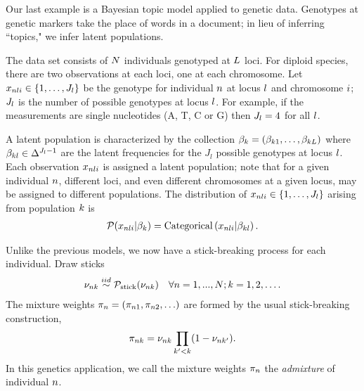 
Our last example is a Bayesian topic model applied to genetic data.
Genotypes at genetic markers take the place of
words in a document; in lieu of inferring ``topics," we infer latent populations.

\begin{ex}

The data set consists of $N$ individuals genotyped at $L$ loci.
For diploid species, there are two observations at each loci, one at each chromosome.
Let $x_{nli}\in\{1, \ldots, J_l\}$ be the genotype for individual $n$ at locus $l$ and chromosome $i$;
$J_l$ is the number of possible genotypes at locus $l$.
For example, if the measurements are single nucleotides (A, T, C or G)
then $J_l = 4$ for all $l$.

A latent population is characterized by the collection
$\beta_k = (\beta_{k1}, \ldots, \beta_{kL})$ where
$\beta_{kl}\in\Delta^{J_l - 1}$ are the latent frequencies for the $J_l$
possible genotypes at locus $l$.
Each observation $x_{nli}$ is assigned a latent population;
note that for a given individual $n$,
different loci, and even different chromosomes at a given locus,
may be assigned to different populations.
The distribution of $x_{nli}\in\{1, \ldots, J_l\}$ arising from population $k$ is
\begin{align*}
\mathcal{P}(x_{nli} \vert \beta_{k}) =
\mathrm{Categorical}\left(x_{nli}\vert \beta_{kl}\right).
\end{align*}


Unlike the previous models, we now have a stick-breaking process for each individual.
Draw sticks
\begin{align*}
\nu_{nk} \overset{iid}{\sim} \mathcal{P}_{\mathrm{stick}}(\nu_{nk}) \quad \forall n = 1, ..., N; k = 1, 2, \ldots.
\end{align*}
The mixture weights
$\pi_{n} = (\pi_{n1}, \pi_{n2}, \ldots)$
are formed by the usual stick-breaking construction,
%
\begin{align*}
\pi_{nk} = \nu_{nk} \prod_{k' < k} (1 - \nu_{nk'}).
\end{align*}
%
In this genetics application,
we call the mixture weights
$\pi_{n}$ the
\textit{admixture} of individual $n$.


\end{ex}
